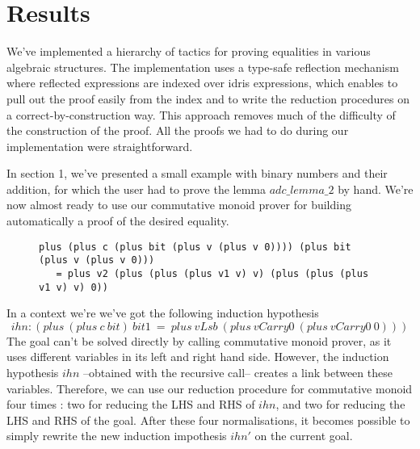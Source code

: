 \section {Results}

We've implemented a hierarchy of tactics for proving equalities in various algebraic structures. The implementation uses a type-safe reflection mechanism where reflected expressions are indexed over idris expressions, which enables to pull out the proof easily from the index and to write the reduction procedures on a correct-by-construction way. This approach removes much of the difficulty of the construction of the proof. All the proofs we had to do during our implementation were straightforward.

In section 1, we've presented a small example with binary numbers and their addition, for which the user had to prove the lemma $adc\_lemma\_2$ by hand. We're now almost ready to use our commutative monoid prover for building automatically a proof of the desired equality.

\begin{figure}[H]
\figrule
\begin{center}
\begin{lstlisting}
plus (plus c (plus bit (plus v (plus v 0)))) (plus bit (plus v (plus v 0))) 
   = plus v2 (plus (plus (plus v1 v) v) (plus (plus (plus v1 v) v) 0))
\end{lstlisting}
\end{center}
\figrule
\end{figure} 

In a context we're we've got the following induction hypothesis \[ihn:(plus\ (plus\ c\ bit)\ bit1\ =\ plus\ vLsb\ (plus\ vCarry0\ (plus\ vCarry0\ 0)))\]
The goal can't be solved directly by calling commutative monoid prover, as it uses different variables in its left and right hand side. However, the induction hypothesis $ihn$ --obtained with the recursive call-- creates a link between these variables. Therefore, we can use our reduction procedure for commutative monoid four times : two for reducing the LHS and RHS of $ihn$, and two for reducing the LHS and RHS of the goal. After these four normalisations, it becomes possible to simply rewrite the new induction impothesis $ihn'$ on the current goal.

